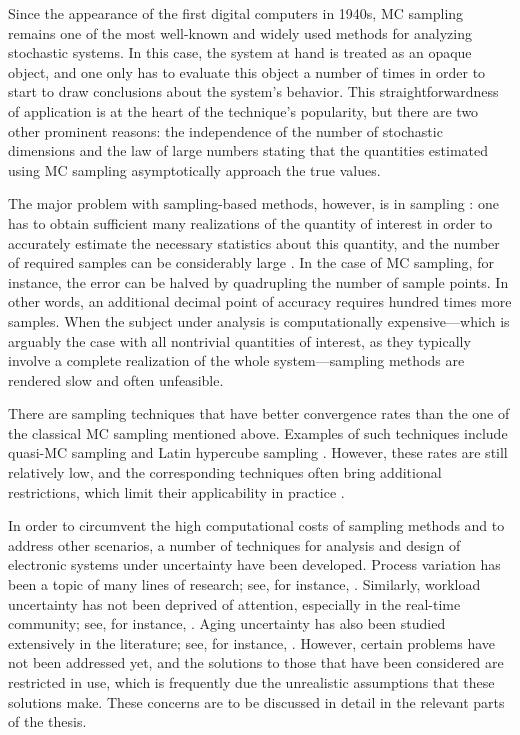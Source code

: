 Since the appearance of the first digital computers in 1940s, \ac{MC} sampling
remains one of the most well-known and widely used methods for analyzing
stochastic systems. In this case, the system at hand is treated as an opaque
object, and one only has to evaluate this object a number of times in order to
start to draw conclusions about the system's behavior. This straightforwardness
of application is at the heart of the technique's popularity, but there are two
other prominent reasons: the independence of the number of stochastic dimensions
and the law of large numbers \cite{durrett2010} stating that the quantities
estimated using \ac{MC} sampling asymptotically approach the true values.

The major problem with sampling-based methods, however, is in sampling \perse:
one has to obtain sufficient many realizations of the quantity of interest in
order to accurately estimate the necessary statistics about this quantity, and
the number of required samples can be considerably large
\cite{diaz-emparanza2002}. In the case of \ac{MC} sampling, for instance, the
error can be halved by quadrupling the number of sample points. In other words,
an additional decimal point of accuracy requires hundred times more samples.
When the subject under analysis is computationally expensive---which is arguably
the case with all nontrivial quantities of interest, as they typically involve a
complete realization of the whole system---sampling methods are rendered slow
and often unfeasible.

There are sampling techniques that have better convergence rates than the one of
the classical \ac{MC} sampling mentioned above. Examples of such techniques
include quasi-\ac{MC} sampling and Latin hypercube sampling \cite{asmussen2007}.
However, these rates are still relatively low, and the corresponding techniques
often bring additional restrictions, which limit their applicability in practice
\cite{xiu2010}.

In order to circumvent the high computational costs of sampling methods and to
address other scenarios, a number of techniques for analysis and design of
electronic systems under uncertainty have been developed. Process variation has
been a topic of many lines of research; see, for instance, \cite{bhardwaj2006,
bhardwaj2008, chandra2010, juan2012, lee2013}. Similarly, workload uncertainty
has not been deprived of attention, especially in the real-time community; see,
for instance, \cite{diaz2002, santinelli2011, quinton2012, tanasa2015}. Aging
uncertainty has also been studied extensively in the literature; see, for
instance, \cite{coskun2006, huang2009b, das2014c}. However, certain problems
have not been addressed yet, and the solutions to those that have been
considered are restricted in use, which is frequently due the unrealistic
assumptions that these solutions make. These concerns are to be discussed in
detail in the relevant parts of the thesis.
